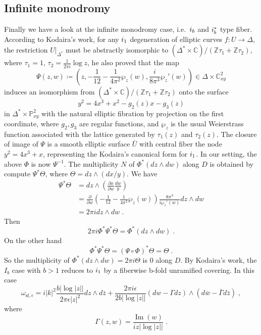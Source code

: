 \subsection{Infinite monodromy}
Finally we have a look at the infinite monodromy case, i.e.\ $\uppercase\expandafter{\romannumeral1}_b$ and $\uppercase\expandafter{\romannumeral1}_b^*$ type fiber. According to Kodaira's work, for any $\uppercase\expandafter{\romannumeral1}_1$ degeneration of elliptic curves $f\colon U\rightarrow \Delta$, the restriction $U|_{\Delta^*}$ must be abstractly isomorphic to $(\Delta^*\times\mathbb{C})/(\mathbb{Z}\tau_1+\mathbb{Z}\tau_2)$, where $\tau_1=1$, $\tau_2=\frac{1}{2\pi i}\log z$, he also proved that the map
\[ \Psi(z,w)\coloneq \left(z,-\frac{1}{12}-\frac{1}{4\pi^2}\wp_z(w),\frac{i}{8\pi^3}\wp_z'(w)\right)\in \Delta\times\mathbb{C}_{xy}^2 \]
induces an isomorphism from $(\Delta^*\times\mathbb{C})/(\mathbb{Z}\tau_1+\mathbb{Z}\tau_2)$ onto the surface
\[ y^2=4x^3+x^2-g_2(z)x-g_3(z) \]
in $\Delta^*\times\mathbb{P}^2_{xy}$ with the natural elliptic fibration by projection on the first coordinate, where $g_2,g_3$ are regular functions, and $\wp_z$ is the usual Weierstrass function associated with the lattice generated by $\tau_1(z)$ and $\tau_2(z)$. The closure of image of $\Psi$ is a smooth elliptic surface $\bar{U}$ with central fiber the node $y^2=4x^3+x$, representing the Kodaira's canonical form for $\uppercase\expandafter{\romannumeral1}_1$. In our setting, the above $\Phi$ is now $\Psi^{-1}$. The multiplicity $N$ of $\Phi^*(dz\wedge dw)$ along $D$ is obtained by compute $\Psi^*\Theta$, where $\Theta=dz\wedge(dx/y)$. We have
\begin{displaymath}
\begin{split}
\Psi^*\Theta&=dz\wedge\left(\frac{\partial x}{\partial w}\frac{dw}{y}\right)\\
&=\frac{\partial}{\partial w}\left(-\frac{1}{12}-\frac{1}{4\pi^2}\wp_z(w)\right)\frac{8\pi^3}{i\wp_z'(w)}dz\wedge dw\\
&=2\pi idz\wedge dw\; .
\end{split}
\end{displaymath}
Then \[ 2\pi i\Phi^*\Psi^*\Theta=\Phi^*(dz\wedge dw)\; . \]
On the other hand
\[ \Phi^*\Psi^*\Theta=(\Psi\circ\Phi)^*\Theta=\Theta\; . \]
So the multiplicity of $\Phi^*(dz\wedge dw)=2\pi i\Theta$ is 0 along $D$. By Kodaira's work, the $I_b$ case with $b>1$ reduces to $\uppercase\expandafter{\romannumeral1}_1$ by a fiberwise b-fold unramified covering. In this case
\[ \omega_{\mathrm{sf},\epsilon}=i|k|^2\frac{b|\log|z||}{2\pi\epsilon |z|^2}dz\wedge d\bar{z}+\frac{2\pi i\epsilon}{2b|\log|z||}(dw-\Gamma dz)\wedge(d\bar{w}-\bar{\Gamma}d\bar{z})\; , \]
where
\[ \Gamma(z,w)=\frac{\operatorname{Im}(w)}{iz|\log|z||}\; . \]
